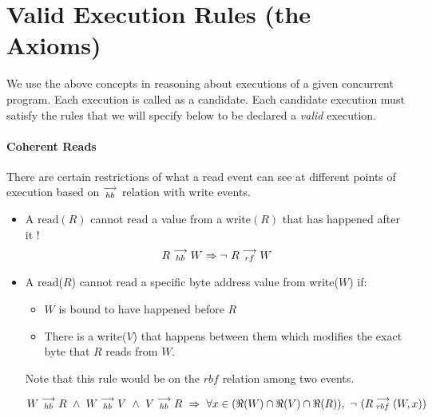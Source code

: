         
    \section{Valid Execution Rules (the Axioms)}
        We use the above concepts in reasoning about executions of a given concurrent program. Each execution is called as a candidate.  Each candidate execution must satisfy the rules that we will specify below to be declared a \textit{valid} execution. 
         
        \paragraph{Coherent Reads} 
        
            There are certain restrictions of what a read event can see at different points of execution based on $\stackrel{\longrightarrow}{_{hb}}$ relation with write events. 
        
            \begin{itemize}
                \item A read$(R)$ cannot read a value from a write$(R)$ that has happened after it ! 
                    \[ R \stackrel{\longrightarrow}{_{hb}} W \Rightarrow{} \neg \ R \stackrel{\longrightarrow}{_{rf}} W \]
                
                \item A read($R$) cannot read a specific byte address value from write($W$) if:
                    \begin{itemize}
                        \item $W$ is bound to have happened before $R$
                        \item There is a write($V$) that happens between them which modifies the exact byte that $R$ reads from $W$.
                    \end{itemize} 
                    Note that this rule would be on the $rbf$ relation among two events. 
                
                    \[
                        W \stck{_{hb}} R
                        \ \wedge \ 
                        W \stck{_{hb}} V \ \wedge \ V \stck{_{hb}} R
                        \ \Rightarrow{} \
                        \forall x \in (\Re(W) \cap \Re(V) \cap \Re(R)), \ \neg \ (R \stck{_{rbf}} (W, x))
                    \]
                    
            \end{itemize}
         
